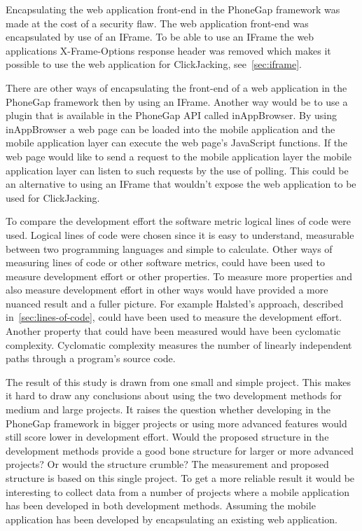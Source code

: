 Encapsulating the web application front-end in the PhoneGap framework was made at the cost of a security flaw. The web application front-end was encapsulated by use of an IFrame. To be able to use an IFrame the web applications X-Frame-Options response header was removed which makes it possible to use the web application for ClickJacking, see~\ref{sec:iframe}. 

There are other ways of encapsulating the front-end of a web application in the PhoneGap framework then by using an IFrame. Another way would be to use a plugin that is available in the PhoneGap API called inAppBrowser. By using inAppBrowser a web page can be loaded into the mobile application and the mobile application layer can execute the web page’s JavaScript functions. If the web page would like to send a request to the mobile application layer the mobile application layer can listen to such requests by the use of polling.  This could be an alternative to using an IFrame that wouldn’t expose the web application to be used for ClickJacking. 

To compare the development effort the software metric logical lines of code were used. Logical lines of code were chosen since it is easy to understand, measurable between two programming languages and simple to calculate. Other ways of measuring lines of code or other software metrics, could have been used to measure development effort or other properties. To measure more properties and also measure development effort in other ways would have provided a more nuanced result and a fuller picture. For example Halsted's approach, described in~\ref{sec:lines-of-code}, could have been used to measure the development effort. Another property that could have been measured would have been cyclomatic complexity. Cyclomatic complexity measures the number of linearly independent paths through a program’s source code. 

The result of this study is drawn from one small and simple project. This makes it hard to draw any conclusions about using the two development methods for medium and large projects. It raises the question whether developing in the PhoneGap framework in bigger projects or using more advanced features would still score lower in development effort. Would the proposed structure in the development methods provide a good bone structure for larger or more advanced projects? Or would the structure crumble? The measurement and proposed structure is based on this single project. To get a more reliable result it would be interesting to collect data from a number of projects where a mobile application has been developed in both development methods. Assuming the mobile application has been developed by encapsulating an existing web application.  

